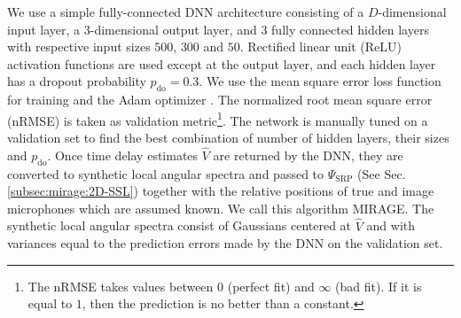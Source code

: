 We use a simple fully-connected DNN architecture consisting of a $D$-dimensional input layer,
a $3$-dimensional output layer, and 3 fully connected hidden layers with respective input
sizes $500$, $300$ and $50$. Rectified linear unit (ReLU)
activation functions are used except at the output layer,
and each hidden layer has a dropout probability $p_\text{do} = 0.3$.
We use the mean square error loss function for training and the Adam optimizer \cite{kingma2014adam}.
The normalized root mean square error (nRMSE) is taken as validation
metric\footnote{The nRMSE takes values between $0$ (perfect fit) and $\infty$ (bad fit).
If it is equal to $1$, then the prediction is no better than a constant.}.
The network is manually tuned on a validation set to find the best combination of number of hidden layers, their sizes and $p_\text{do}$.
Once time delay estimates $\hat{V}$ are returned by the DNN, they are converted to synthetic
local angular spectra and passed to $\Psi_\text{SRP}$ (See Sec. \cref{subsec:mirage:2D-SSL})
together with the relative positions of true and image microphones which are assumed known.
We call this algorithm MIRAGE. The synthetic local angular spectra consist of Gaussians
centered at $\hat{V}$ and with variances equal to the prediction errors made by
the DNN on the validation set.

